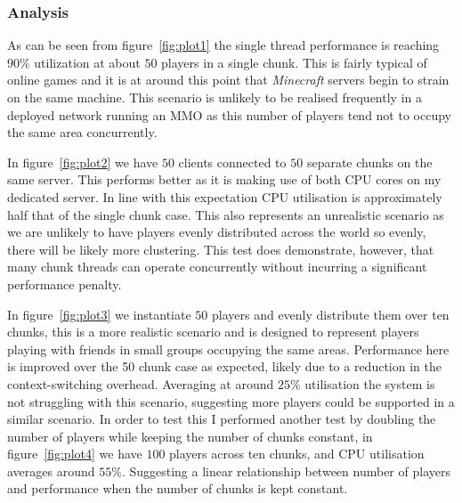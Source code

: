 \documentclass[12pt,notitlepage,a4paper]{report}
\begin{document}
	\subsubsection{Analysis}
	As can be seen from figure~\ref{fig:plot1} the single thread performance is reaching $90\%$ utilization at about $50$ players in a single chunk. This is fairly typical of online games and it is at around this point that \emph{Minecraft} servers begin to strain on the same machine. This scenario is unlikely to be realised frequently in a deployed network running an MMO as this number of players tend not to occupy the same area concurrently.
	
	In figure~\ref{fig:plot2} we have $50$ clients connected to $50$ separate chunks on the same server. This performs better as it is making use of both CPU cores on my dedicated server. In line with this expectation CPU utilisation is approximately half that of the single chunk case. This also represents an unrealistic scenario as we are unlikely to have players evenly distributed across the world so evenly, there will be likely more clustering. This test does demonstrate, however, that many chunk threads can operate concurrently without incurring a significant performance penalty.
	
	In figure~\ref{fig:plot3} we instantiate $50$ players and evenly distribute them over ten chunks, this is a more realistic scenario and is designed to represent players playing with friends in small groups occupying the same areas. Performance here is improved over the 50 chunk case as expected, likely due to a reduction in the context-switching overhead. Averaging at around $25\%$ utilisation the system is not struggling with this scenario, suggesting more players could be supported in a similar scenario. In order to test this I performed another test by doubling the number of players while keeping the number of chunks constant, in figure~\ref{fig:plot4} we have $100$ players across ten chunks, and CPU utilisation averages around $55\%$. Suggesting a linear relationship between number of players and performance when the number of chunks is kept constant.
	
\end{document}
